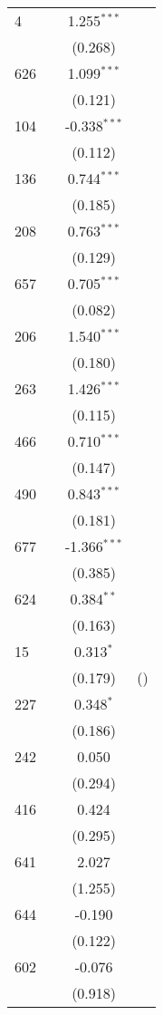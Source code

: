 \begin{table}[htbp]
\begin{adjustbox}{max width=\textwidth}
\begin{tabular}{lccc}
    4   &  & 1.255$^{\ast\ast\ast}$ &  \\
    &  & (0.268) &  \\
    626 &  & 1.099$^{\ast\ast\ast}$ &  \\
    &  & (0.121) &  \\
    104 &  & -0.338$^{\ast\ast\ast}$ &  \\
    &  & (0.112) &  \\
    136 &  & 0.744$^{\ast\ast\ast}$ &  \\
    &  & (0.185) &  \\
    208 &  & 0.763$^{\ast\ast\ast}$ &  \\
    &  & (0.129) &  \\
    657 &  & 0.705$^{\ast\ast\ast}$ &  \\
    &  & (0.082) &  \\
    206 &  & 1.540$^{\ast\ast\ast}$ &  \\
    &  & (0.180) &  \\
    263 &  & 1.426$^{\ast\ast\ast}$ &  \\
    &  & (0.115) &  \\
    466 &  & 0.710$^{\ast\ast\ast}$ &  \\
    &  & (0.147) &  \\
    490 &  & 0.843$^{\ast\ast\ast}$ &  \\
    &  & (0.181) &  \\
    677 &  & -1.366$^{\ast\ast\ast}$ &  \\
    &  & (0.385) &  \\
    624 &  & 0.384$^{\ast\ast}$ &  \\
    &  & (0.163) &  \\
    15  &  & 0.313$^{\ast}$ &  \\
    &  & (0.179) & () \\
    227  &  & 0.348$^{\ast}$ &  \\
    &  & (0.186) &  \\
    242  &  & 0.050 &  \\
    &  & (0.294) &  \\
    416  &  & 0.424 &  \\
    &  & (0.295) &  \\
    641  &  & 2.027 &  \\
    &  & (1.255) &  \\
    644  &  & -0.190 &  \\
    &  & (0.122) &  \\
    602  &  & -0.076 &  \\
    &  & (0.918) &  \\

\end{tabular}
\end{adjustbox}
\end{table}
